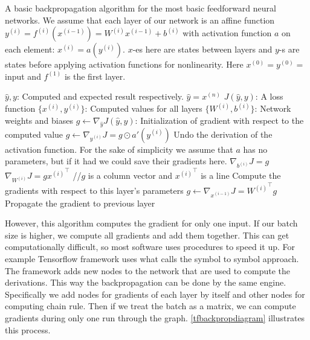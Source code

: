 \begin{algorithm}[h]
\caption{A basic backpropagation algorithm for the most basic feedforward neural networks. We assume that each layer of our network is an affine function $y^{(i)}=f^{(i)}(x^{(i-1)})=W^{(i)}x^{(i-1)}+b^{(i)}$ with activation function $a$ on each element: $x^{(i)}=a(y^{(i)})$. $x$-es here are states between layers and $y$-s are states before applying activation functions for nonlinearity. Here $x^{(0)}=y^{(0)}=$ input and $f^{(1)}$ is the first layer.}
\begin{algorithmic}
\REQUIRE $\widehat{y},y$: Computed and expected result respectively. $\widehat{y}=x^{(n)}$
\REQUIRE $J(\widehat{y},y)$: A loss function
\REQUIRE $\{x^{(i)},y^{(i)}\}$: Computed values for all layers 
\REQUIRE $\{W^{(i)},b^{(i)}\}$: Network weights and biases
\STATE $g\leftarrow \nabla_{\hat{y}}J(\widehat{y},y)$: Initialization of gradient with respect to the computed value
	\STATE $g\leftarrow \nabla_{y^{(i)}}J=g\odot a'(y^{(i)})$
	\STATE Undo the derivation of the activation function. For the sake of simplicity we assume that $a$ has no parameters, but if it had we could save their gradients here.
	\STATE 
	\STATE $\nabla_{b^{(i)}}J=g$
	\STATE $\nabla_{W^{(i)}}J=g{x^{(i)}}^\top$ //$g$ is a column vector and ${x^{(i)}}^\top$ is a line
	\STATE Compute the gradients with respect to this layer's parameters
	\STATE
	\STATE $g\leftarrow \nabla_{x^{(i-1)}}J={W^{(i)}}^\top g$
	\STATE Propagate the gradient to previous layer
\ENDFOR
\end{algorithmic}
\end{algorithm}

However, this algorithm computes the gradient for only one input. If our batch size is higher, we compute all gradients and add them together. This can get computationally difficult, so most software uses procedures to speed it up. For example Tensorflow framework uses what \cite{neural} calls the symbol to symbol approach. The framework adds new nodes to the network that are used to compute the derivations. This way the backpropagation can be done by the same engine. Specifically we add nodes for gradients of each layer by itself and other nodes for computing chain rule. Then if we treat the batch as a matrix, we can compute gradients during only one run through the graph. \autoref{tfbackpropdiagram} illustrates this process.

